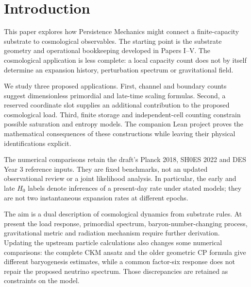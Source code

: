 \section{Introduction}
This paper explores how Persistence Mechanics might connect a finite-capacity substrate to cosmological observables. The starting point is the substrate geometry and operational bookkeeping developed in Papers I--V. The cosmological application is less complete: a local capacity count does not by itself determine an expansion history, perturbation spectrum or gravitational field.

We study three proposed applications. First, channel and boundary counts suggest dimensionless primordial and late-time scaling formulas. Second, a reserved coordinate slot supplies an additional contribution to the proposed cosmological load. Third, finite storage and independent-cell counting constrain possible saturation and entropy models. The companion Lean project proves the mathematical consequences of these constructions while leaving their physical identifications explicit.

The numerical comparisons retain the draft's Planck 2018, SH0ES 2022 and DES Year 3 reference inputs. They are fixed benchmarks, not an updated observational review or a joint likelihood analysis. In particular, the early and late $H_0$ labels denote inferences of a present-day rate under stated models; they are not two instantaneous expansion rates at different epochs.

The aim is a dual description of cosmological dynamics from substrate rules. At present the load response, primordial spectrum, baryon-number-changing process, gravitational metric and radiation mechanism require further derivation. Updating the upstream particle calculations also changes some numerical comparisons: the complete CKM ansatz and the older geometric CP formula give different baryogenesis estimates, while a common factor-six response does not repair the proposed neutrino spectrum. Those discrepancies are retained as constraints on the model.
